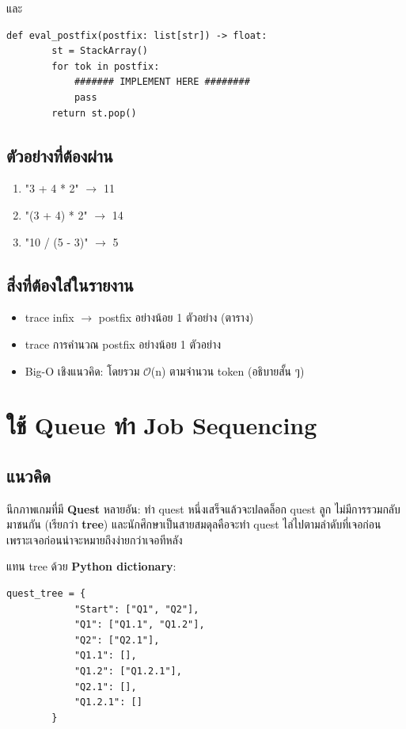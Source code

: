 \documentclass[12pt,a4paper]{article}
\newcommand{\bigO}{\ensuremath{\mathcal{O}}}
\begin{document}
	และ
	\begin{lstlisting}[style=py]
	def eval_postfix(postfix: list[str]) -> float:
		st = StackArray()
		for tok in postfix:
			####### IMPLEMENT HERE ########
			pass
		return st.pop()
	\end{lstlisting}
	
	\subsection*{ตัวอย่างที่ต้องผ่าน}
	\begin{enumerate}[label=(\alph*)]
		\item {"3 + 4 * 2"} $\rightarrow$ 11
		\item {"(3 + 4) * 2"} $\rightarrow$ 14
		\item {"10 / (5 - 3)"} $\rightarrow$ 5
	\end{enumerate}
	
	\subsection*{สิ่งที่ต้องใส่ในรายงาน}
	\begin{itemize}
		\item trace infix $\rightarrow$ postfix อย่างน้อย 1 ตัวอย่าง (ตาราง)
		\item trace การคำนวณ postfix อย่างน้อย 1 ตัวอย่าง
		\item Big-O เชิงแนวคิด: โดยรวม \bigO(n) ตามจำนวน token (อธิบายสั้น ๆ)
	\end{itemize}
	
	\newpage
	\section{ใช้ Queue ทำ Job Sequencing}
	\subsection*{แนวคิด}
	นึกภาพเกมที่มี \textbf{Quest} หลายอัน: ทำ quest หนึ่งเสร็จแล้วจะปลดล็อก quest ลูก
	ไม่มีการรวมกลับมาชนกัน (เรียกว่า \textbf{tree}) และนักศึกษาเป็นสายสมดุลคือจะทำ quest ไล่ไปตามลำดับที่เจอก่อน เพราะเจอก่อนน่าจะหมายถึงง่ายกว่าเจอทีหลัง
	
	แทน tree ด้วย \textbf{Python dictionary}:
	\begin{lstlisting}[style=py]
		quest_tree = {
			"Start": ["Q1", "Q2"],
			"Q1": ["Q1.1", "Q1.2"],
			"Q2": ["Q2.1"],
			"Q1.1": [],
			"Q1.2": ["Q1.2.1"],
			"Q2.1": [],
			"Q1.2.1": []
		}
	\end{lstlisting}
	
\end{document}

